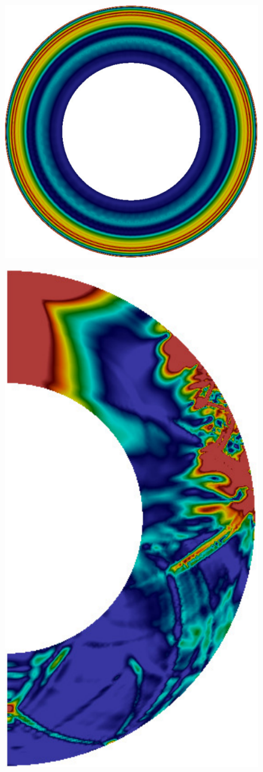 \documentclass[extra]{gji}
\begin{document}
\begin{figure}
\begin{minipage}{0.6\textwidth}
\begin{minipage}{.585\textwidth}
      \includegraphics[height=.85\textwidth]{fig/snapshot/1d-phi.pdf}
      \label{fig:1deq}  
    \end{minipage}
    \begin{minipage}{.39\textwidth}
      \centering
      \includegraphics[height=1.275\textwidth]{fig/snapshot/1d-slice.pdf}

\end{minipage}
\end{minipage}
\end{figure}
\end{document}
